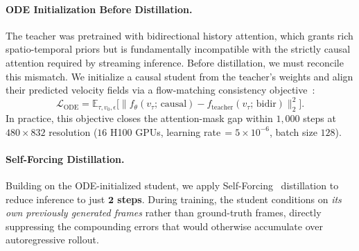 \paragraph{ODE Initialization Before Distillation.}
The teacher was pretrained with bidirectional history attention,
which grants rich spatio-temporal priors but is fundamentally incompatible with
the strictly causal attention required by streaming inference.
Before distillation, we must reconcile this mismatch. 
We initialize a causal student from the teacher's weights and align their 
predicted velocity fields via a flow-matching consistency
objective~\citep{lipman2022flow}:
\begin{equation}
  \mathcal{L}_{\text{ODE}} = \mathbb{E}_{\tau,v_0,\epsilon}\bigl[\|f_\theta(v_\tau;\,\text{causal}) - f_{\text{teacher}}(v_\tau;\,\text{bidir})\|_2^2\bigr].
\end{equation}
In practice,
this objective closes the attention-mask gap within $1{,}000$ steps at 
$480{\times}832$ resolution ($16$ H100 GPUs, learning rate\,$=5\!\times\!10^{-6}$, batch size $128$).

\paragraph{Self-Forcing Distillation.}
Building on the ODE-initialized student, 
we apply Self-Forcing~\citep{chen2025selfforcing} distillation to reduce inference to just
\textbf{$\mathbf{2}$ steps}. During training, the student conditions on \emph{its own
previously generated frames} rather than ground-truth frames, 
directly suppressing the compounding errors that 
would otherwise accumulate over autoregressive rollout.

